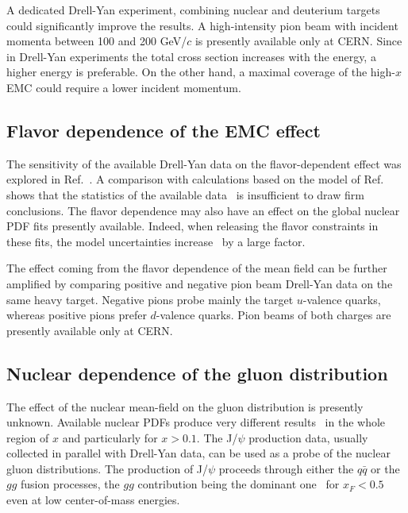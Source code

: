A dedicated Drell-Yan experiment, 
combining nuclear and deuterium targets could significantly improve the results. 
A high-intensity pion beam with incident momenta between 100 and 200 GeV/$c$ is presently available 
only at CERN. Since in Drell-Yan experiments the total cross section increases with the energy, a higher 
energy is preferable. On the other hand, a maximal coverage of the high-$x$ EMC could require a 
lower incident momentum.  

\subsection{Flavor dependence of the EMC effect} 

The sensitivity of the available Drell-Yan data on the flavor-dependent effect was explored in 
Ref.~\cite{Dutta:2010pg}. A comparison with calculations based on the model of Ref.~\cite{Cloet:2009qs} 
shows that the  statistics of the available data~\cite{Badier:1981ci,Bordalo:1987cs} is insufficient to draw firm conclusions. 
The flavor dependence may also have an effect 
on the global nuclear PDF fits presently available. Indeed, when releasing the flavor constraints in these fits, 
the model uncertainties increase~\cite{Paakkinen:2016wxk} by a large factor. 

The effect coming from the flavor dependence of the mean field can be further amplified by 
comparing positive and negative pion beam Drell-Yan data on the same heavy target. Negative pions probe mainly the 
target $u$-valence quarks, whereas positive pions prefer $d$-valence quarks. Pion beams of both charges
are presently available only at CERN. 

\subsection{Nuclear dependence of the gluon distribution}
%
The effect of the nuclear mean-field on the gluon distribution is presently unknown. Available nuclear PDFs produce very different results~\cite{Cazaroto:2008qh} in the whole region of $x$ and particularly for $x > 0.1$. The J/$\psi$ production data,  usually collected in parallel with Drell-Yan data, can be used as a probe of the nuclear gluon distributions.  The production of J/$\psi$ proceeds through either the $q\bar q$ or the $gg$ fusion processes, the $gg$  contribution being the dominant one~\cite{Vogt:1999dw} for $x_F < 0.5$  even at low center-of-mass energies. 

